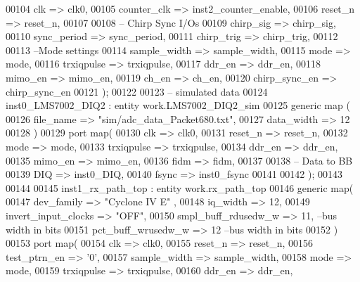 \begin{DoxyCode}
00104     clk                 => clk0,
00105     counter_clk             => inst2_counter_enable,
00106     reset_n             => reset_n,
00107 
00108 \textcolor{keyword}{    -- Chirp Sync I/Os}
00109     chirp_sig               => chirp_sig,
00110     sync_period             => sync_period,
00111     chirp_trig              => chirp_trig,
00112         
00113 \textcolor{keyword}{    --Mode settings}
00114     sample_width         => sample_width,
00115     mode                 => mode,
00116     trxiqpulse           => trxiqpulse,
00117     ddr_en               => ddr_en,
00118     mimo_en              => mimo_en,
00119     ch_en                => ch_en,
00120     chirp_sync_en           => chirp_sync_en
00121 \textcolor{vhdlchar}{)};
00122    
00123 \textcolor{keyword}{-- simulated data}
00124    inst0\_LMS7002\_DIQ2 : \textcolor{keywordflow}{entity} work.LMS7002_DIQ2_sim 
00125 \textcolor{keywordflow}{generic} \textcolor{keywordflow}{map} (
00126     file_name => \textcolor{keyword}{"sim/adc\_data\_Packet680.txt"},
00127     data_width => \textcolor{vhdllogic}{12}
00128 \textcolor{vhdlchar}{)}
00129 \textcolor{keywordflow}{port} \textcolor{keywordflow}{map}(
00130     clk         => clk0,
00131     reset_n     => reset_n, 
00132     mode            => mode,
00133     trxiqpulse  => trxiqpulse,
00134     ddr_en      => ddr_en, 
00135     mimo_en     => mimo_en,
00136     fidm            => fidm, 
00137 
00138 \textcolor{keyword}{    -- Data to BB}
00139     DIQ             => inst0_DIQ,
00140     fsync           => inst0_fsync
00141     
00142     \textcolor{vhdlchar}{)};
00143     
00144     
00145 inst1\_rx\_path\_top : \textcolor{keywordflow}{entity} work.rx_path_top
00146    \textcolor{keywordflow}{generic} \textcolor{keywordflow}{map}( 
00147       dev_family                => \textcolor{keyword}{"Cyclone IV E"}  ,
00148       iq_width                  => \textcolor{vhdllogic}{12},
00149       invert_input_clocks   => \textcolor{keyword}{"OFF"},
00150       smpl_buff_rdusedw_w  => \textcolor{vhdllogic}{11},\textcolor{keyword}{ --bus width in bits }
00151       pct_buff_wrusedw_w   => \textcolor{vhdllogic}{12} \textcolor{keyword}{--bus width in bits }
00152       \textcolor{vhdlchar}{)}
00153    \textcolor{keywordflow}{port} \textcolor{keywordflow}{map}(
00154       clk                  => clk0,
00155       reset_n              => reset_n,
00156       test_ptrn_en         => '0',
00157       sample_width         => sample_width,
00158       mode                   => mode,
00159         trxiqpulse           => trxiqpulse,
00160         ddr_en               => ddr_en,

\end{DoxyCode}
